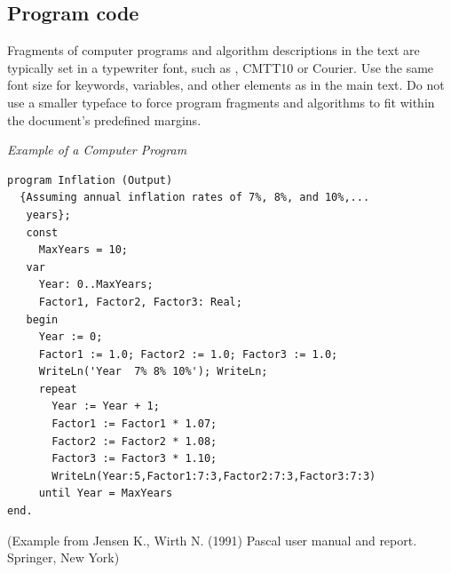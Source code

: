 \subsection{Program code}

Fragments of computer programs and algorithm descriptions in the text are typically set in a typewriter font, such as \eg, CMTT10 or Courier. Use the same font size for keywords, variables, and other elements as in the main text. Do not use a smaller typeface to force program fragments and algorithms to fit within the document’s predefined margins.

\noindent
{\it Example of a Computer Program}
\begin{verbatim}
program Inflation (Output)
  {Assuming annual inflation rates of 7%, 8%, and 10%,...
   years};
   const
     MaxYears = 10;
   var
     Year: 0..MaxYears;
     Factor1, Factor2, Factor3: Real;
   begin
     Year := 0;
     Factor1 := 1.0; Factor2 := 1.0; Factor3 := 1.0;
     WriteLn('Year  7% 8% 10%'); WriteLn;
     repeat
       Year := Year + 1;
       Factor1 := Factor1 * 1.07;
       Factor2 := Factor2 * 1.08;
       Factor3 := Factor3 * 1.10;
       WriteLn(Year:5,Factor1:7:3,Factor2:7:3,Factor3:7:3)
     until Year = MaxYears
end.
\end{verbatim}
%
\noindent
{\small (Example from Jensen K., Wirth N. (1991) Pascal user manual and
report. Springer, New York)}

